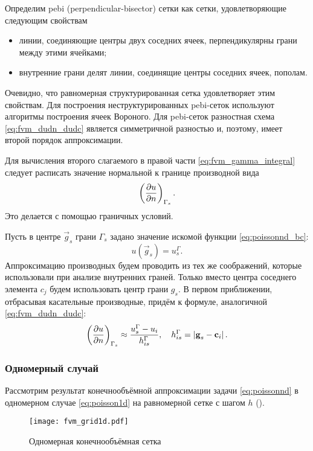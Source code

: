 Определим pebi (perpendicular-bisector) сетки как сетки, удовлетворяющие следующим свойствам
\begin{itemize}
\item линии, соединяющие центры двух соседних ячеек, перпендикулярны грани между этими ячейками;
\item внутренние грани делят линии, соединящие центры соседних ячеек, пополам.
\end{itemize}
Очевидно, что равномерная структурированная сетка удовлетворяет этим свойствам.
Для построения неструктурированных pebi-сеток используют алгоритмы построения ячеек Вороного.
Для pebi-сеток разностная схема \eqref{eq:fvm_dudn_dudc}
является симметричной разностью и, поэтому, имеет второй порядок аппроксимации.

Для вычисления второго слагаемого в правой части 
\cref{eq:fvm_gamma_integral}
следует расписать значение нормальной 
к границе производной вида
$$
\left(\frac{\partial u}{\partial n}\right)_{\Gamma_{s}}.
$$
Это делается с помощью граничных условий.

Пусть в центре $\vec g_s$ грани $\Gamma_{s}$ задано 
значение искомой функции \cref{eq:poissonnd_bc}:
\begin{equation}
\label{eq:fvm_bc1}
u(\vec g_s) = u^\Gamma_s.
\end{equation}
Аппроксимацию производных
будем проводить из тех же соображений, которые использовали
при анализе внутренних граней. Только вместо центра соседнего элемента
$c_j$ будем использовать центр грани $g_s$.
В первом приближении, отбрасывая касательные производные, придём к формуле, аналогичной \cref{eq:fvm_dudn_dudc}:
\begin{equation}
\label{eq:fvm_bc1_approx}
\left(\frac{\partial u}{\partial n}\right)_{\Gamma_s} \approx \frac{u^\Gamma_s - u_i}{h^\Gamma_{is}}, \quad h^\Gamma_{is} = \left| \boldsymbol{\rm g}_s  - \boldsymbol{\rm c}_i \right|.
\end{equation}

\subsubsection{Одномерный случай}
Рассмотрим результат конечнообъёмной аппроксимации
задачи \cref{eq:poissonnd} в одномерном случае \cref{eq:poisson1d}
на равномерной сетке с шагом $h$ ().

\begin{figure}[h!]
\centering
\texttt{[image: fvm\_grid1d.pdf]}
\caption{Одномерная конечнообъёмная сетка}
\label{fig:fvm_grid1d}
\end{figure}

